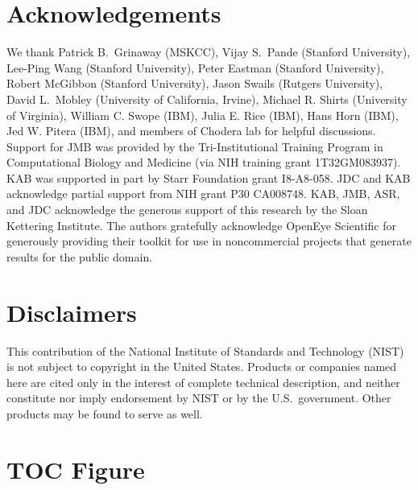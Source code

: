 \documentclass[journal=jacsat,manuscript=article]{achemso}
\begin{document}

\section{Acknowledgements}

We thank Patrick B.~Grinaway (MSKCC), Vijay S.~Pande (Stanford University), Lee-Ping Wang (Stanford University), Peter Eastman (Stanford University), Robert McGibbon (Stanford University), Jason Swails (Rutgers University), David L.~Mobley (University of California, Irvine), Michael R. Shirts (University of Virginia), William C. Swope (IBM), Julia E. Rice (IBM), Hans Horn (IBM), Jed W. Pitera (IBM), and members of Chodera lab for helpful discussions.  
Support for JMB was provided by the Tri-Institutional Training Program in Computational Biology and Medicine (via NIH training grant 1T32GM083937).  
KAB was supported in part by Starr Foundation grant I8-A8-058.  
JDC and KAB acknowledge partial support from NIH grant P30 CA008748.  KAB, JMB, ASR, and JDC acknowledge the generous support of this research by the Sloan Kettering Institute.
The authors gratefully acknowledge OpenEye Scientific for generously providing their toolkit for use in noncommercial projects that generate results for the public domain.


\section{Disclaimers}

This contribution of the National Institute of Standards and Technology (NIST) is not subject to copyright in the United States.  
Products or companies named here are cited only in the interest of complete technical description, and neither constitute nor imply endorsement by NIST or by the U.S.~government.  
Other products may be found to serve as well.

\clearpage

\section{TOC Figure}
\end{document}
